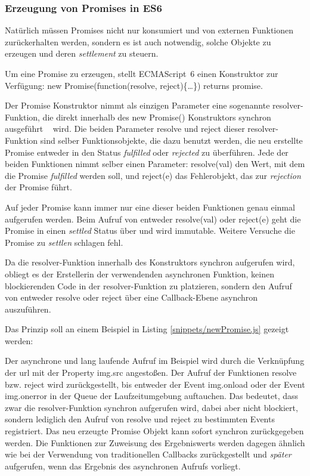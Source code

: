 \documentclass[
11pt, %
a4paper, %
oneside, %
pdfspacing, %
headinclude,
BCOR5mm, %
ngerman, %
bibtotocnumbered,
]{scrartcl}
\begin{document}
		\subsubsection{Erzeugung von Promises in ES6}
			Natürlich müssen Promises nicht nur konsumiert und von externen Funktionen zurückerhalten werden, sondern es ist auch notwendig, solche Objekte zu erzeugen und deren \emph{settlement} zu steuern.
		
			Um eine Promise zu erzeugen, stellt ECMAScript~6 einen Konstruktor zur Verfügung: 
			\textsf{new Promise(function(resolve, reject)\{\ldots\}) returns promise}.
			
			Der Promise Konstruktor nimmt als einzigen Parameter eine sogenannte resolver-Funktion,			
			die direkt innerhalb des \textsf{new Promise()} Konstruktors synchron ausgeführt ~\citep[S.~45]{Simpson.2015} wird. Die beiden Parameter \textsf{resolve} und \textsf{reject} dieser resolver-Funktion sind selber Funktionsobjekte, die dazu benutzt werden, die neu erstellte Promise entweder in den Status \emph{fulfilled} oder \emph{rejected} zu überführen. Jede der beiden Funktionen nimmt selber einen Parameter: \textsf{resolve(val)} den Wert, mit dem die Promise \emph{fulfilled} werden soll, und \textsf{reject(e)} das Fehlerobjekt, das zur \emph{rejection} der Promise führt.
			
			Auf jeder Promise kann immer nur eine dieser beiden Funktionen genau einmal aufgerufen werden. Beim Aufruf von entweder \textsf{resolve(val)} oder \textsf{\-reject(e)} geht die Promise in einen \emph{settled} Status über und wird immutable. Weitere Versuche die Promise zu \emph{settlen} schlagen fehl.
			
			Da die resolver-Funktion innerhalb des Konstruktors synchron aufgerufen wird, obliegt es der Erstellerin der verwendenden asynchronen Funktion, keinen blockierenden \-Code in der resolver-Funktion zu platzieren, sondern den Aufruf von entweder \textsf{resolve} oder \textsf{reject} über eine Callback-Ebene asynchron auszuführen.
			
			Das Prinzip soll an einem Beispiel in Listing \ref{snippets/newPromise.js} gezeigt werden:
			
			Der asynchrone und lang laufende Aufruf im Beispiel wird durch die Verknüpfung der \textsf{url} mit der Property \textsf{img.src} angestoßen. Der Aufruf der Funktionen \textsf{resolve} bzw. \textsf{reject} wird zurückgestellt, bis entweder der Event \textsf{img.onload} oder der Event \textsf{img.onerror} in der Queue der Laufzeitumgebung auftauchen. Das bedeutet, dass zwar die \textsf{resolver}-Funktion synchron aufgerufen wird, dabei aber nicht blockiert, sondern lediglich den Aufruf von \textsf{\-resolve} und \textsf{reject} zu bestimmten Events registriert. Das neu erzeugte Promise Objekt kann sofort synchron zurückgegeben werden. Die Funktionen zur Zuweisung des Ergebniswerts werden dagegen ähnlich wie bei der Verwendung von traditionellen Callbacks zurückgestellt und \emph{später} aufgerufen, wenn das Ergebnis des asynchronen Aufrufs vorliegt.
			
\end{document}
